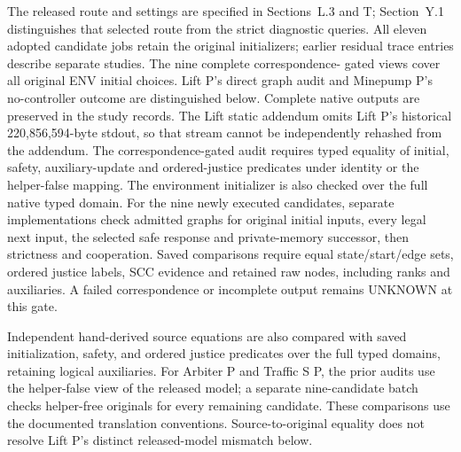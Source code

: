 The released route and settings are specified in Sections~L.3 and T;
Section~Y.1 distinguishes that selected route from the strict diagnostic
queries. All eleven
adopted candidate jobs retain the original initializers; earlier residual
trace entries describe separate studies. The nine complete correspondence-
gated views cover all original ENV initial choices. Lift P's direct graph
audit and Minepump P's no-controller outcome are distinguished below. Complete
native outputs are preserved in the study records. The Lift static addendum
omits Lift P's historical 220,856,594-byte stdout, so that stream cannot
be independently rehashed from the addendum. The correspondence-gated audit requires typed equality
of initial, safety, auxiliary-update and ordered-justice predicates under
identity or the helper-false mapping. The environment initializer is also
checked over the full native typed domain. For the nine newly executed
candidates, separate implementations check admitted graphs for original initial inputs,
every legal next input, the selected safe response
and private-memory successor, then strictness and cooperation. Saved
comparisons require equal state/start/edge sets, ordered justice labels,
SCC evidence and retained raw nodes, including ranks and auxiliaries.
A failed correspondence or incomplete output remains UNKNOWN at this gate.

Independent hand-derived source equations are also compared with saved
initialization, safety, and ordered justice predicates over the full
typed domains, retaining logical auxiliaries. For Arbiter P and Traffic S P,
the prior audits use the helper-false view of the released model;
a separate nine-candidate batch checks helper-free originals for every
remaining candidate. These comparisons use the documented translation
conventions. Source-to-original equality does not resolve Lift P's
distinct released-model mismatch below.

